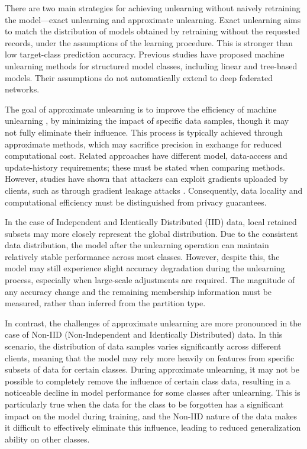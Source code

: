 \documentclass[software,article,submit,moreauthors]{Definitions/mdpi}
\begin{document}
There are two main strategies for achieving unlearning without naively
retraining the model---exact unlearning and approximate unlearning. Exact unlearning aims to match the distribution of models obtained by
retraining without the requested records, under the assumptions of the learning
procedure. This is stronger than low target-class prediction accuracy. Previous studies
\cite{ref8,ref9,ref10,ref11,ref12} have proposed machine unlearning methods for
structured model classes, including linear and tree-based models. Their
assumptions do not automatically extend to deep federated networks\cite{ref13}.

The goal of approximate unlearning is to improve the efficiency of machine
unlearning \cite{ref8,ref14}, by minimizing the impact of specific data samples,
though it may not fully eliminate their influence. This process is typically
achieved through approximate methods, which may sacrifice precision in exchange
for reduced computational cost. Related approaches\cite{ref13,ref15,ref16} have different model, data-access
and update-history requirements; these must be stated when comparing methods. However, studies have shown that attackers
can exploit gradients uploaded by clients, such as through gradient leakage
attacks \cite{ref17,ref18}. Consequently, data locality and computational efficiency must be distinguished
from privacy guarantees.

In the case of Independent and Identically Distributed (IID) data, local
retained subsets may more closely represent the global distribution. Due to the consistent
data distribution, the model after the unlearning operation can maintain
relatively stable performance across most classes. However, despite this, the
model may still experience slight accuracy degradation during the unlearning
process, especially when large-scale adjustments are required. The magnitude of any accuracy change and the remaining membership information
must be measured, rather than inferred from the partition type.

In contrast, the challenges of approximate unlearning are more pronounced in the
case of Non-IID (Non-Independent and Identically Distributed) data. In this
scenario, the distribution of data samples varies significantly across different
clients, meaning that the model may rely more heavily on features from specific
subsets of data for certain classes. During approximate unlearning, it may not
be possible to completely remove the influence of certain class data, resulting
in a noticeable decline in model performance for some classes after unlearning.
This is particularly true when the data for the class to be forgotten has a
significant impact on the model during training, and the Non-IID nature of the
data makes it difficult to effectively eliminate this influence, leading to
reduced generalization ability on other classes.
\end{document}
